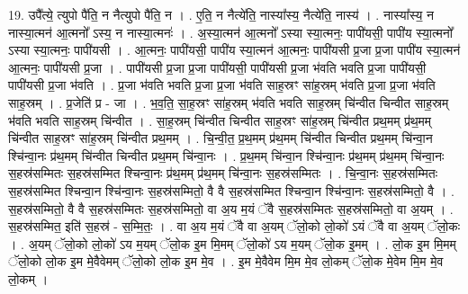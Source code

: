 \documentclass[17pt]{extarticle}
\begin{document}
19. उपै᳚त्ये॒ त्युपो पै॑ति॒ न नैत्युपो पै॑ति॒ न । . ए॒ति॒ न नैत्ये॑ति॒ नास्या᳚स्य॒ नैत्ये॑ति॒ नास्य॑ । . नास्या᳚स्य॒ न नास्या॒त्मन॑ आ॒त्मनो᳚ ऽस्य॒ न नास्या॒त्मनः॑ । . अ॒स्या॒त्मन॑ आ॒त्मनो᳚ ऽस्या स्या॒त्मनः॒ पापी॑यसी॒ पापी॑य स्या॒त्मनो᳚ ऽस्या स्या॒त्मनः॒ पापी॑यसी । . आ॒त्मनः॒ पापी॑यसी॒ पापी॑य स्या॒त्मन॑ आ॒त्मनः॒ पापी॑यसी प्र॒जा प्र॒जा पापी॑य स्या॒त्मन॑ आ॒त्मनः॒ पापी॑यसी प्र॒जा । . पापी॑यसी प्र॒जा प्र॒जा पापी॑यसी॒ पापी॑यसी प्र॒जा भ॑वति भवति प्र॒जा पापी॑यसी॒ पापी॑यसी प्र॒जा भ॑वति । . प्र॒जा भ॑वति भवति प्र॒जा प्र॒जा भ॑वति साह॒स्रꣳ सा॑ह॒स्रम् भ॑वति प्र॒जा प्र॒जा भ॑वति साह॒स्रम् । . प्र॒जेति॑ प्र - जा । . भ॒व॒ति॒ सा॒ह॒स्रꣳ सा॑ह॒स्रम् भ॑वति भवति साह॒स्रम् चि॑न्वीत चिन्वीत साह॒स्रम् भ॑वति भवति साह॒स्रम् चि॑न्वीत । . सा॒ह॒स्रम् चि॑न्वीत चिन्वीत साह॒स्रꣳ सा॑ह॒स्रम् चि॑न्वीत प्रथ॒मम् प्र॑थ॒मम् चि॑न्वीत साह॒स्रꣳ सा॑ह॒स्रम् चि॑न्वीत प्रथ॒मम् । . चि॒न्वी॒त॒ प्र॒थ॒मम् प्र॑थ॒मम् चि॑न्वीत चिन्वीत प्रथ॒मम् चि॑न्वा॒न श्चि॑न्वा॒नः प्र॑थ॒मम् चि॑न्वीत चिन्वीत प्रथ॒मम् चि॑न्वा॒नः । . प्र॒थ॒मम् चि॑न्वा॒न श्चि॑न्वा॒नः प्र॑थ॒मम् प्र॑थ॒मम् चि॑न्वा॒नः स॒हस्र॑सम्मितः स॒हस्र॑सम्मित श्चिन्वा॒नः प्र॑थ॒मम् प्र॑थ॒मम् चि॑न्वा॒नः स॒हस्र॑सम्मितः । . चि॒न्वा॒नः स॒हस्र॑सम्मितः स॒हस्र॑सम्मित श्चिन्वा॒न श्चि॑न्वा॒नः स॒हस्र॑सम्मितो॒ वै वै स॒हस्र॑सम्मित श्चिन्वा॒न श्चि॑न्वा॒नः स॒हस्र॑सम्मितो॒ वै । . स॒हस्र॑सम्मितो॒ वै वै स॒हस्र॑सम्मितः स॒हस्र॑सम्मितो॒ वा अ॒य म॒यं ॅवै स॒हस्र॑सम्मितः स॒हस्र॑सम्मितो॒ वा अ॒यम् । . स॒हस्र॑सम्मित॒ इति॑ स॒हस्र॑ - स॒म्मि॒तः॒ । . वा अ॒य म॒यं ॅवै वा अ॒यम् ॅलो॒को लो॒को॑ ऽयं ॅवै वा अ॒यम् ॅलो॒कः । . अ॒यम् ॅलो॒को लो॒को॑ ऽय म॒यम् ॅलो॒क इ॒म मि॒मम् ॅलो॒को॑ ऽय म॒यम् ॅलो॒क इ॒मम् । . लो॒क इ॒म मि॒मम् ॅलो॒को लो॒क इ॒म मे॒वैवेमम् ॅलो॒को लो॒क इ॒म मे॒व । . इ॒म मे॒वैवेम मि॒म मे॒व लो॒कम् ॅलो॒क मे॒वेम मि॒म मे॒व लो॒कम् । \newline
\end{document}
